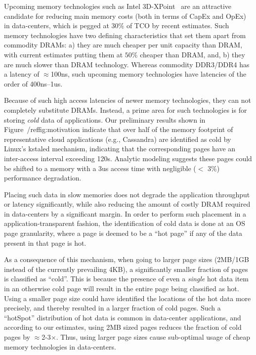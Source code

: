 
%
Upcoming memory technologies such as Intel 3D-XPoint~\cite{xpoint} are an
attractive candidate for reducing main memory costs (both in terms of CapEx and
OpEx) in data-centers, which is pegged at 30\% of TCO by recent
estimates. Such memory technologies have two defining characteristics
that set them apart from commodity DRAMs: a) they are much cheaper per unit
capacity than DRAM, with current estimates putting them at $50\%$ cheaper
than DRAM, and, b) they are much slower than DRAM technology. Whereas
commodity DDR3/DDR4 has a latency of $\approx$100ns, such upcoming memory
technologies have latencies of the order of 400ns--1us.

Because of such high access latencies of newer memory technologies, they can not
completely substitute DRAMs. Instead, a prime area for such technologies is for
storing {\it cold} data of applications.  Our preliminary results shown in
Figure~/ref{fig:motivation} indicate that over half of the memory footprint of
representative cloud applications (e.g., Cassandra) are identified as cold by
Linux’s kstaled mechanism, indicating that the corresponding pages have an
inter-access interval exceeding 120s.  Analytic modeling suggests these pages
could be shifted to a memory with a 3us access time with negligible ($<$ 3\%)
performance degradation.


Placing such data in slow memories does not degrade the application throughput
or latency significantly, while also reducing the amount of costly DRAM required
in data-centers by a significant margin. In order to perform such placement in a
application-transparent fashion, the identification of cold data is done at an
OS page granularity, where a page is deemed to be a ``hot page'' if any of the
data present in that page is hot.

As a consequence of this mechanism, when going to larger page sizes (2MB/1GB
instead of the currently prevailing 4KB), a significantly smaller fraction of
pages is classified as ``cold''. This is because the presence of even a {\it
single} hot data item in an otherwise cold page will result in the entire page
being classified as hot. Using a smaller page size could have identified the
locations of the hot data more precisely, and thereby resulted in a larger
fraction of cold pages. Such a ``hotSpot'' distribution of hot data is common in
data-center applications, and according to our estimates, using 2MB sized pages
reduces the fraction of cold pages by $\approx$2-3$\times$. Thus, using larger
page sizes cause sub-optimal usage of cheap memory technologies in data-centers.

